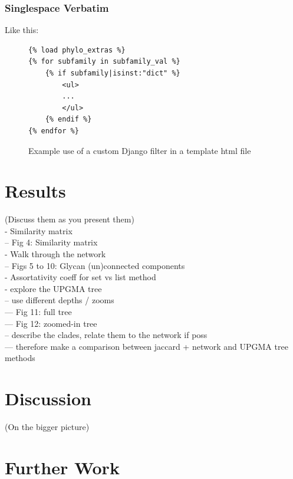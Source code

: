 \documentclass[12pt,a4paper]{article}
\begin{document}
\subsubsection{Singlespace Verbatim}
\label{sec:template_tags}
Like this:
\singlespace
\begin{figure}[H]
\begin{verbatim}
{% load phylo_extras %}
{% for subfamily in subfamily_val %}
    {% if subfamily|isinst:"dict" %}
        <ul>
        ...
        </ul>
    {% endif %}
{% endfor %}
\end{verbatim}
\caption{Example use of a custom Django filter in a template html file}
\label{fig:custom_filter_code}
\end{figure}
\doublespace

\section{Results}
\label{sec:results}
(Discuss them as you present them)\\

- Similarity matrix\\
-- Fig 4: Similarity matrix\\
- Walk through the network\\
-- Figs 5 to 10: Glycan (un)connected components\\
- Assortativity coeff for set vs list method\\

- explore the UPGMA tree\\
-- use different depths / zooms\\
--- Fig 11: full tree\\
--- Fig 12: zoomed-in tree\\
-- describe the clades, relate them to the network if poss\\
--- therefore make a comparison between jaccard + network and UPGMA tree methods\\


\section{Discussion}
\label{sec:discussion}
(On the bigger picture)\\

\section{Further Work}
\label{sec:further_work}
\end{document}
